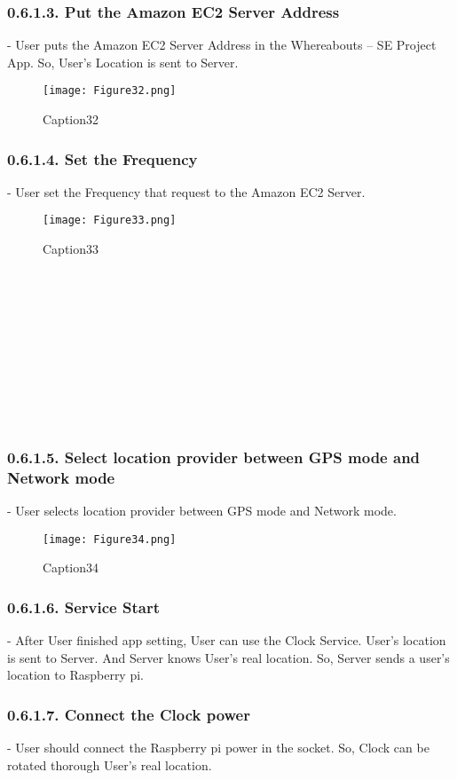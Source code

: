 \documentclass[10pt,a4paper,twocolumn]{report}
\begin{document}
		\subsubsection{0.6.1.3. Put the Amazon EC2 Server Address}
		- User puts the Amazon EC2 Server Address in the Whereabouts – SE Project App. So, User’s Location is sent to Server.\\
		\begin{figure}[h]
				\texttt{[image: Figure32.png]}
				\caption{Caption32}
				\label{fig32}
		\end{figure}
		\subsubsection{0.6.1.4. Set the Frequency}
		- User set the Frequency that request to the Amazon EC2 Server. \\
		\begin{figure}[h]
				\texttt{[image: Figure33.png]}
				\caption{Caption33}
				\label{fig33}
		\end{figure}
		\\\\\\\\\\\\\\\\\
		\subsubsection{0.6.1.5. Select location provider between GPS mode and Network mode}
		- User selects location provider between GPS mode and Network mode.\\
		\begin{figure}[h]
				\texttt{[image: Figure34.png]}
				\caption{Caption34}
				\label{fig34}
		\end{figure}
		\subsubsection{0.6.1.6. Service Start}
		- After User finished app setting, User can use the Clock Service. User’s location is sent to Server. And Server knows User’s real location. So, Server sends a user’s location to Raspberry pi. \\
		\subsubsection{0.6.1.7. Connect the Clock power}
		- User should connect the Raspberry pi power in the socket. So, Clock can be rotated thorough User’s real location.  \\
		
\end{document}
